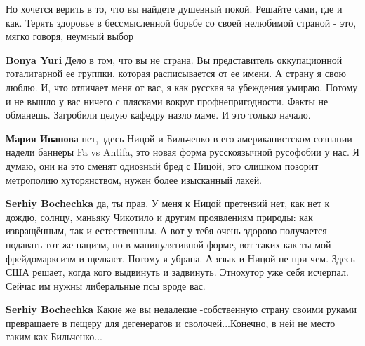 \begin{itemize}
\begin{itemize}
Но хочется верить в то, что вы найдете душевный покой. Решайте сами, где и как.
Терять здоровье в бессмысленной борьбе со своей нелюбимой страной - это, мягко
говоря, неумный выбор

 
\textbf{Bonya Yuri} Дело в том, что вы не страна. Вы представитель оккупационной тоталитарной ее группки, которая расписывается от ее имени. А страну я свою люблю. И, что отличает меня от вас, я как русская за убеждения умираю. Потому и не вышло у вас ничего с плясками вокруг профнепригодности. Факты не обманешь. Загробили целую кафедру назло маме. И это только начало.

 
\textbf{Мария Иванова} нет, здесь Ницой и Бильченко в его американистском сознании надели баннеры Fa vs Antifa, это новая форма русскоязычной русофобии у нас. Я думаю, они на это сменят одиозный бред с Ницой, это слишком позорит метрополию хуторянством, нужен более изысканный лакей.

 
\textbf{Serhiy Bochechka} да, ты прав. У меня к Ницой претензий нет, как нет к дождю, солнцу, маньяку Чикотило и другим проявлениям природы: как извращённым, так и естественным. А вот у тебя очень здорово получается подавать тот же нацизм, но в манипулятивной форме, вот таких как ты мой фрейдомарксизм и щелкает. Потому я убрана. А язык и Ницой не при чем. Здесь США решает, когда кого выдвинуть и задвинуть. Этнохутор уже себя исчерпал. Сейчас им нужны либеральные псы вроде вас.

 
\textbf{Serhiy Bochechka} Какие же вы недалекие -собственную страну своими руками превращаете в пещеру для дегенератов и сволочей...Конечно, в ней не место таким как Бильченко...


\end{itemize}
\end{itemize}
